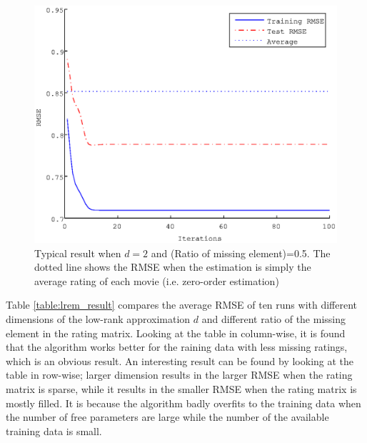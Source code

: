 \documentclass{article}
\begin{document}
\begin{figure}[ht]
  \begin{center}
    \includegraphics[scale=0.7]{figure/lrem_typical_plot.eps}
  \end{center}
  \caption{Typical result when $d = 2$ and (Ratio of missing element)=0.5. The dotted line shows the RMSE when the estimation is simply the average rating of each movie (i.e. zero-order estimation)}
  \label{fig:lrem_typical_plot.eps}
\end{figure}

Table \ref{table:lrem_result} compares the average RMSE of ten runs with different dimensions of the low-rank approximation $d$ and different ratio of the missing element in the rating matrix. Looking at the table in column-wise, it is found that the algorithm works better for the raining data with less missing ratings, which is an obvious result. An interesting result can be found by looking at the table in row-wise; larger dimension results in the larger RMSE when the rating matrix is sparse, while it results in the smaller RMSE when the rating matrix is mostly filled. It is because the algorithm badly overfits to the training data when the number of free parameters are large while the number of the available training data is small. 
\end{document}
